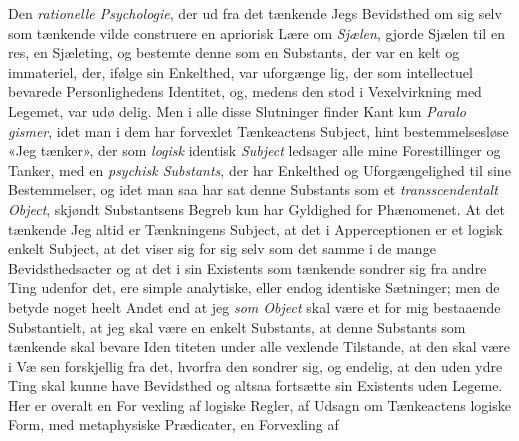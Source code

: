 \documentclass[12pt,a4paper]{book}
\begin{document}
Den \emph{rationelle Psychologie}, der ud fra det tænkende
Jegs Bevidsthed om sig selv som tænkende vilde construere
en apriorisk Lære om \emph{Sjælen}, gjorde Sjælen til en res, en
Sjæleting, og bestemte denne som en Substants, der var en\-%
kelt og immateriel, der, ifølge sin Enkelthed, var uforgænge\-%
lig, der som intellectuel bevarede Personlighedens Identitet,
og, medens den stod i Vexelvirkning med Legemet, var udø\-%
delig. Men i alle disse Slutninger finder Kant kun \emph{Paralo\-%
gismer}, idet man i dem har forvexlet Tænkeactens Subject,
hint bestemmelsesløse «Jeg tænker», der som \emph{logisk} identisk
\emph{Subject} ledsager alle mine Forestillinger og Tanker, med en
\emph{psychisk Substants}, der har Enkelthed og Uforgængelighed
til sine Bestemmelser, og idet man saa har sat denne Substants
som et \emph{transscendentalt Object}, skjøndt Substantsens
Begreb kun har Gyldighed for Phænomenet. At det tænkende
Jeg altid er Tænkningens Subject, at det i Apperceptionen er
et logisk enkelt Subject, at det viser sig for sig selv som det
samme i de mange Bevidsthedsacter og at det i sin Existents
som tænkende sondrer sig fra andre Ting udenfor det, ere
simple analytiske, eller endog identiske Sætninger; men de
betyde noget heelt Andet end at jeg \emph{som Object} skal være
et for mig bestaaende Substantielt, at jeg skal være en enkelt
Substants, at denne Substants som tænkende skal bevare Iden\-%
titeten under alle vexlende Tilstande, at den skal være i Væ\-%
sen forskjellig fra det, hvorfra den sondrer sig, og endelig, at
den uden ydre Ting skal kunne have Bevidsthed og altsaa
fortsætte sin Existents uden Legeme. Her er overalt en For\-%
vexling af logiske Regler, af Udsagn om Tænkeactens logiske
Form, med metaphysiske Prædicater, en Forvexling af
\end{document}
